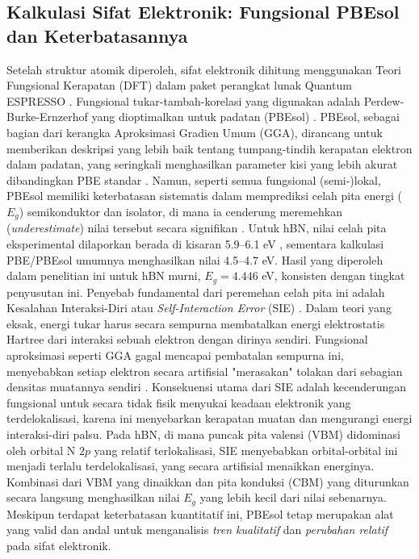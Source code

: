 \subsection{Kalkulasi Sifat Elektronik: Fungsional PBEsol dan Keterbatasannya}
\label{subsec:dft_qe}
Setelah struktur atomik diperoleh, sifat elektronik dihitung menggunakan Teori Fungsional Kerapatan (DFT) \cite{Hohenberg1964, Kohn1965} dalam paket perangkat lunak Quantum ESPRESSO \cite{Giannozzi2009, Giannozzi2017}.
Fungsional tukar-tambah-korelasi yang digunakan adalah Perdew-Burke-Ernzerhof yang dioptimalkan untuk padatan (PBEsol) \cite{Perdew2008}.
PBEsol, sebagai bagian dari kerangka Aproksimasi Gradien Umum (GGA), dirancang untuk memberikan deskripsi yang lebih baik tentang tumpang-tindih kerapatan elektron dalam padatan, yang seringkali menghasilkan parameter kisi yang lebih akurat dibandingkan PBE standar \cite{Perdew2008}.
Namun, seperti semua fungsional (semi-)lokal, PBEsol memiliki keterbatasan sistematis dalam memprediksi celah pita energi ($E_g$) semikonduktor dan isolator, di mana ia cenderung meremehkan (\emph{underestimate}) nilai tersebut secara signifikan \cite{perdew2005}.
Untuk hBN, nilai celah pita eksperimental dilaporkan berada di kisaran 5.9–6.1 eV \cite{Watanabe2004, Elias2019}, sementara kalkulasi PBE/PBEsol umumnya menghasilkan nilai 4.5–4.7 eV.
Hasil yang diperoleh dalam penelitian ini untuk hBN murni, $E_g = 4.446$ eV, konsisten dengan tingkat penyusutan ini.
Penyebab fundamental dari peremehan celah pita ini adalah Kesalahan Interaksi-Diri atau \emph{Self-Interaction Error} (SIE) \cite{perdew1981}.
Dalam teori yang eksak, energi tukar harus secara sempurna membatalkan energi elektrostatis Hartree dari interaksi sebuah elektron dengan dirinya sendiri.
Fungsional aproksimasi seperti GGA gagal mencapai pembatalan sempurna ini, menyebabkan setiap elektron secara artifisial "merasakan" tolakan dari sebagian densitas muatannya sendiri \cite{MoriSanchez2008}.
Konsekuensi utama dari SIE adalah kecenderungan fungsional untuk secara tidak fisik menyukai keadaan elektronik yang terdelokalisasi, karena ini menyebarkan kerapatan muatan dan mengurangi energi interaksi-diri palsu.
Pada hBN, di mana puncak pita valensi (VBM) didominasi oleh orbital N $2p$ yang relatif terlokalisasi, SIE menyebabkan orbital-orbital ini menjadi terlalu terdelokalisasi, yang secara artifisial menaikkan energinya.
Kombinasi dari VBM yang dinaikkan dan pita konduksi (CBM) yang diturunkan secara langsung menghasilkan nilai $E_g$ yang lebih kecil dari nilai sebenarnya.
Meskipun terdapat keterbatasan kuantitatif ini, PBEsol tetap merupakan alat yang valid dan andal untuk menganalisis \emph{tren kualitatif} dan \emph{perubahan relatif} pada sifat elektronik.
